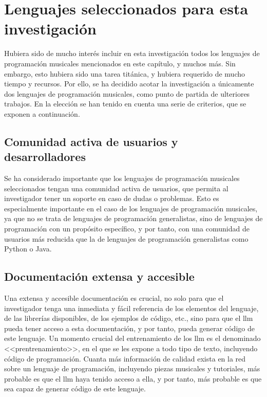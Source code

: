 \section{Lenguajes seleccionados para esta investigación}

Hubiera sido de mucho interés incluir en esta investigación todos los lenguajes de programación musicales mencionados en este capítulo, y muchos más. Sin embargo, esto hubiera sido una tarea titánica, y hubiera requerido de mucho tiempo y recursos. Por ello, se ha decidido acotar la investigación a únicamente dos lenguajes de programación musicales, como punto de partida de ulteriores trabajos. En la elección se han tenido en cuenta una serie de criterios, que se exponen a continuación.


\subsection{Comunidad activa de usuarios y desarrolladores} 
Se ha considerado importante que los lenguajes de programación musicales seleccionados tengan una comunidad activa de usuarios, que permita al investigador tener un soporte en caso de dudas o problemas. Esto es especialmente importante en el caso de los lenguajes de programación musicales, ya que no se trata de lenguajes de programación generalistas, sino de lenguajes de programación con un propósito específico, y por tanto, con una comunidad de usuarios más reducida que la de lenguajes de programación generalistas como Python o Java.

\subsection{Documentación extensa y accesible}
Una extensa y accesible documentación es crucial, no solo para que el investigador tenga una inmediata y fácil referencia de los elementos del lenguaje, de las librerías disponibles, de los ejemplos de código, etc., sino para que el \gls{llm} pueda tener acceso a esta documentación, y por tanto, pueda generar código de este lenguaje. Un momento crucial del entrenamiento de los \gls{llm} es el denominado <<prentrenamiento>>, en el que se les expone a todo tipo de texto, incluyendo código de programación. Cuanta más información de calidad exista en la red sobre un lenguaje de programación, incluyendo piezas musicales y tutoriales, más probable es que el \gls{llm} haya tenido acceso a ella, y por tanto, más probable es que sea capaz de generar código de este lenguaje.

